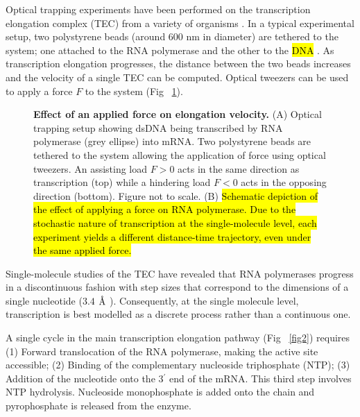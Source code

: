 \documentclass[10pt,letterpaper]{article}
\newcommand{\angstrom}{\mbox{\normalfont\AA}}
\begin{document}
Optical trapping experiments have been performed on the transcription elongation complex (TEC) from a variety of organisms \cite{abbondanzieri2005direct, adelman2002single, bai2007mechanochemical, hodges2009nucleosomal, galburt2007backtracking, skinner2004promoter, dulin2015elongation}. In a typical experimental setup, two polystyrene beads (around 600 nm in diameter) are tethered to the system; one attached to the RNA polymerase and the other to the \hl{DNA} \cite{abbondanzieri2005direct}. As transcription elongation progresses, the distance between the two beads increases and the velocity of a single TEC can be computed. Optical tweezers can be used to apply a force $F$ to the system (Fig ~\ref{fig1}).  \par

\begin{figure}[!h]
\caption{\textbf{ Effect of an applied force on elongation velocity.}
(A) Optical trapping setup showing dsDNA being transcribed by RNA polymerase (grey ellipse) into mRNA. Two polystyrene beads are tethered to the system allowing the application of force using optical tweezers. An assisting load $F>0$ acts in the same direction as transcription (top) while a hindering load $F<0$ acts in the opposing direction (bottom). Figure not to scale. (B) \hl{Schematic depiction of the effect of applying a force on RNA polymerase. Due to the stochastic nature of transcription at the single-molecule level, each experiment yields a different distance-time trajectory, even under the same applied force.} }
\label{fig1}
\end{figure}




Single-molecule studies of the TEC have revealed that RNA polymerases progress in a discontinuous fashion \cite{abbondanzieri2005direct, neuman2003ubiquitous, davenport2000single, tolic2004diversity, abbondanzieri2005picocalorimetry} with step sizes that correspond to the dimensions of a single nucleotide ($3.4$ $\angstrom$ \cite{watson1953molecular}). Consequently, at the single molecule level, transcription is best modelled as a discrete process rather than a continuous one.    \par



A single cycle in the main transcription elongation pathway (Fig ~\ref{fig2}) requires (1) Forward translocation of the RNA polymerase, making the active site accessible; (2) Binding of the complementary nucleoside triphosphate (NTP); (3) Addition of the nucleotide onto the 3$^\prime$ end of the mRNA. This third step involves NTP hydrolysis. Nucleoside monophosphate is added onto the chain and pyrophosphate is released from the enzyme.  \\
\end{document}
